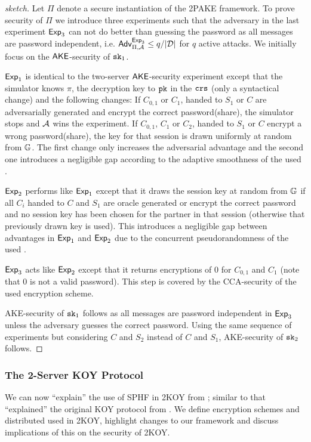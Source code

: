 \begin{proof}[sketch]
Let $\Pi$ denote a secure instantiation of the 2PAKE framework.
To prove security of $\Pi$ we introduce three experiments such that the adversary in the last experiment $\mathsf{Exp}_3$ can not do better than guessing the password as all messages are password independent, i.e. $\mathsf{Adv}_{\Pi,\mathcal{A}}^{\mathsf{Exp}_3}\leq q/|\mathcal{D}|$ for $q$ active attacks.
We initially focus on the $\mathsf{AKE}$-security of $\mathtt{sk}_1$.

$\mathsf{Exp}_1$ is identical to the two-server $\mathsf{AKE}$-security experiment except that the simulator knows $\pi$, the decryption key to $\mathtt{pk}$ in the $\mathtt{crs}$ (only a syntactical change) and the following changes:
If $C_{0,1}$ or $C_{1}$, handed to $S_1$ or $C$ are adversarially generated and encrypt the correct password(share), the simulator stops and $\mathcal{A}$ wins the experiment.
If $C_{0,1}$, $C_1$ or $C_2$, handed to $S_1$ or $C$ encrypt a wrong password(share), the key for that session is drawn uniformly at random from $\mathbb{G}$.
The first change only increases the adversarial advantage and the second one introduces a negligible gap according to the adaptive smoothness of the used \SPHFF.

$\mathsf{Exp}_2$ performs like $\mathsf{Exp}_1$ except that it draws the session key at random from $\mathbb{G}$ if all $C_i$ handed to $C$ and $S_1$ are oracle generated or encrypt the correct password and no session key has been chosen for the partner in that session (otherwise that previously drawn key is used).
This introduces a negligible gap between advantages in $\mathsf{Exp}_1$ and $\mathsf{Exp}_2$ due to the concurrent pseudorandomness of the used \SPHFF.

$\mathsf{Exp}_3$ acts like $\mathsf{Exp}_2$ except that it returns encryptions of $0$ for $C_{0,1}$ and $C_1$ (note that $0$ is not a valid password).
This step is covered by the CCA-security of the used encryption scheme.

AKE-security of $\mathtt{sk}_1$ follows as all messages are password independent in $\mathsf{Exp}_3$ unless the adversary guesses the correct password.
Using the same sequence of experiments but considering $C$ and $S_2$ instead of $C$ and $S_1$, AKE-security of $\mathtt{sk}_2$ follows.
\end{proof}

\subsubsection{The 2-Server KOY Protocol}\label{sec:twokoy}
We can  now ``explain'' the use of SPHF in 2KOY from \cite{Katz_MacKenzie_Taban_Gligor_2005}; similar to \cite{Gennaro2003} that ``explained'' the original KOY protocol from \cite{Katz_Ostrovsky_Yung_2001}.
We define encryption schemes and distributed \SPHFF used in 2KOY, highlight changes to our framework and discuss implications of this on the security of 2KOY.

